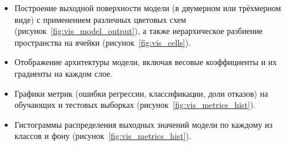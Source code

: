 \begin{itemize}
    \item Построение выходной поверхности модели (в двумерном или трёхмерном виде) с применением различных цветовых схем (рисунок~\cref{fig:vis_model_output}), а также иерархическое разбиение пространства на ячейки (рисунок~\cref{fig:vis_cells}).
    \item Отображение архитектуры модели, включая весовые коэффициенты и их градиенты на каждом слое.
    \item Графики метрик (ошибки регрессии, классификации, доли отказов) на обучающих и тестовых выборках (рисунок~\cref{fig:vis_metrics_hist}).
    \item Гистограммы распределения выходных значений модели по каждому из классов и фону (рисунок~\cref{fig:vis_metrics_hist}).
\end{itemize}

